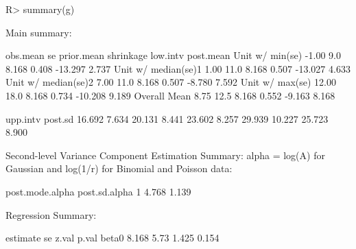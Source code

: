\documentclass[article]{jss}
\begin{document}
\begin{CodeChunk}
\begin{CodeInput}
R> summary(g)
\end{CodeInput}
\begin{CodeOutput}
Main summary:

                    obs.mean   se prior.mean shrinkage low.intv post.mean
Unit w/ min(se)        -1.00  9.0      8.168     0.408  -13.297     2.737
Unit w/ median(se)1     1.00 11.0      8.168     0.507  -13.027     4.633
Unit w/ median(se)2     7.00 11.0      8.168     0.507   -8.780     7.592
Unit w/ max(se)        12.00 18.0      8.168     0.734  -10.208     9.189
Overall Mean            8.75 12.5      8.168     0.552   -9.163     8.168

                     upp.intv post.sd
                       16.692   7.634
                       20.131   8.441
                       23.602   8.257
                       29.939  10.227
                       25.723   8.900

Second-level Variance Component Estimation Summary:
alpha = log(A) for Gaussian and log(1/r) for Binomial and Poisson data:

  post.mode.alpha post.sd.alpha
1           4.768         1.139


Regression Summary:

      estimate   se z.val p.val
beta0    8.168 5.73 1.425 0.154
\end{CodeOutput}
\end{CodeChunk}



\end{document}
